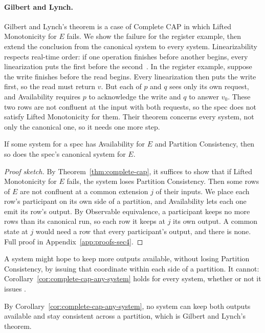 \paragraph{Gilbert and Lynch.}
Gilbert and Lynch's theorem is a case of Complete CAP in which Lifted Monotonicity for $E$ fails. We show the failure for the register example, then extend the conclusion from the canonical system to every system.  Linearizability
respects real-time order: if one operation finishes before another begins,
every linearization puts the first before the
second~\cite{herlihy1990linearizability}.  In the register example, suppose the
write finishes before the read begins.  Every linearization then puts the write
first, so the read must return $v$.  But each of $p$ and $q$ sees only its own
request, and Availability requires $p$ to acknowledge the write and $q$ to
answer $v_0$.  These two rows are not confluent at the input with both requests, so
the spec does not satisfy Lifted Monotonicity for them.  Their theorem
concerns every system, not only the canonical one, so it needs one more step.

\begin{corollary}
\label{cor:complete-cap-any-system}
If some system for a spec has Availability for $E$ and Partition Consistency,
then so does the spec's canonical system for $E$.
\end{corollary}

\begin{proof}[Proof sketch]
By Theorem~\ref{thm:complete-cap}, it suffices to show that if Lifted
Monotonicity for $E$ fails, the system loses Partition Consistency.  Then some
rows of $E$ are not confluent at a common extension $j$ of their inputs.  We place each row's participant on
its own side of a partition, and Availability lets each one emit its row's
output.  By Observable equivalence, a participant keeps no more rows than its
canonical run, so each row it keeps at $j$ \outrel its own output.  A common
state at $j$ would need a row that \outrel every participant's output, and
there is none.  Full proof in Appendix~\ref{app:proofs-sec4}.
\end{proof}

A system might hope to keep more outputs available, without losing Partition
Consistency, by issuing \commitments that coordinate within each side of a
partition.  It cannot: Corollary~\ref{cor:complete-cap-any-system} holds for
every system, whether or not it issues \commitments.

By Corollary~\ref{cor:complete-cap-any-system}, no system can keep both outputs
available and stay consistent across a partition, which is Gilbert and Lynch's
theorem.


